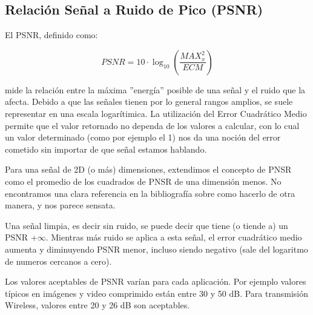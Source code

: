 \subsection {Relaci\'on Se\~nal a Ruido de Pico (PSNR)}

El PSNR, definido como:

$$
\mathit{PSNR} = 10 \cdot \log_{10} \left( \frac{\mathit{MAX}^2_x}{\mathit{ECM}}
\right)
$$

mide la relaci\'on entre la m\'axima ''energ\'ia'' posible de una se\~nal y el
ruido que la afecta. Debido a que las se\~nales tienen por lo general rangos
amplios, se suele representar en una escala logar\'itimica. La utilizaci\'on del
 Error Cuadr\'atico Medio permite que el valor retornado no dependa de los
valores a calcular, con lo cual un valor determinado (como por ejemplo el 1) nos
da una noci\'on del error cometido sin importar de que se\~nal estamos hablando.


Para una se\~nal de 2D (o m\'as) dimensiones, extendimos el concepto de PNSR como
el promedio de los cuadrados de PNSR de una dimensi\'on menos. No encontramos una clara
referencia en la bibliograf\'ia sobre como hacerlo de otra manera, y nos parece sensata.

Una se\~nal limpia, es decir sin ruido, se puede decir que tiene (o tiende a) un PSNR
+$\infty$. Mientras m\'as ruido se aplica a esta se\~nal, el error cuadr\'atico
medio aumenta y diminuyendo PSNR menor, incluso siendo negativo (sale del logaritmo
de numeros cercanos a cero).

Los valores aceptables de PSNR var\'ian para cada aplicaci\'on. Por ejemplo valores t\'ipicos en
im\'agenes y video comprimido est\'an entre 30 y 50 dB. Para transmisi\'on
Wireless, valores entre 20 y 26 dB son aceptables. 
